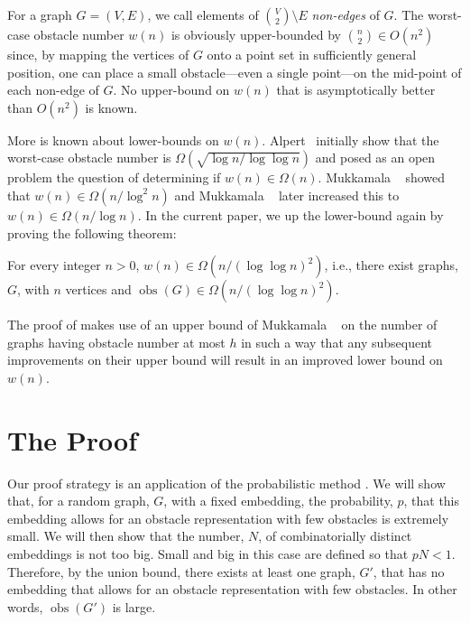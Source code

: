 \documentclass{patmorin}
\DeclareMathOperator{\obs}{obs}
\begin{document}
For a graph $G=(V,E)$, we call elements of $\binom{V}{2}\setminus E$
\emph{non-edges} of $G$.  The worst-case obstacle number $w(n)$ is
obviously upper-bounded by $\binom{n}{2}\in O(n^2)$ since, by mapping
the vertices of $G$ onto a point set in sufficiently general position,
one can place a small obstacle---even a single point---on the mid-point
of each non-edge of $G$.  No upper-bound on $w(n)$ that is asymptotically
better than $O(n^2)$ is known.

More is known about lower-bounds on $w(n)$.  Alpert \etal\
initially show that the worst-case obstacle number is
$\Omega(\sqrt{\log n/\log\log n})$ and posed as an open problem the question
of determining if $w(n)\in\Omega(n)$.
Mukkamala \etal\ \cite{mukkamala.pach.ea:graphs} showed that $w(n)\in
\Omega(n/\log^2 n)$ and Mukkamala \etal\ \cite{mukkamala.pach.ea:lower}
later increased this to $w(n)\in\Omega(n/\log n)$.  In the current paper,
we up the lower-bound again by proving the following theorem:
\begin{thm}
  For every integer $n>0$, $w(n)\in\Omega(n/(\log\log n)^2)$, i.e., there
  exist graphs, $G$, with $n$ vertices and $\obs(G)\in\Omega(n/(\log\log
  n)^2)$.
\end{thm}

The proof of  makes use of an upper bound of Mukkamala \etal\
\cite[Theorem~1]{mukkamala.pach.ea:lower} on the number of graphs having
obstacle number at most $h$ in such a way that any subsequent improvements
on their upper bound will result in an improved lower bound on $w(n)$.

\section{The Proof}

Our proof strategy is an application of the probabilistic method
\cite{alon.spencer:probabilistic}.  
We will show that, for a random graph,
$G$, with a fixed embedding, the probability, $p$, that this embedding
allows for an obstacle representation with few obstacles is extremely
small.  We will then show that the number, $N$, of combinatorially
distinct embeddings is not too big.  Small and big in this case are
defined so that $pN < 1$.  Therefore, by the union bound, there exists at
least one graph, $G'$, that has no embedding that allows for an obstacle
representation with few obstacles.  In other words, $\obs(G')$ is large.
\end{document}
